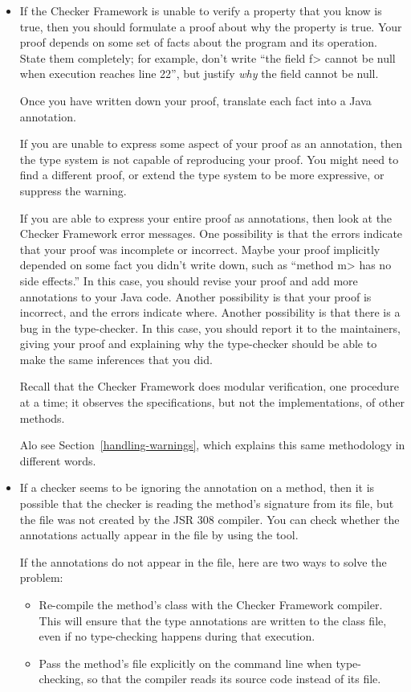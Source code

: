 \begin{itemize}
\item
  If the Checker Framework is unable to verify a property that you know is
  true, then you should formulate a proof about why the property is true.
  Your proof depends on some set of facts about the program and its
  operation.  State them completely; for example, don't write ``the field
  \<f> cannot be null when execution reaches line 22'', but justify
  \emph{why} the field cannot be null.

  Once you have written down your proof, translate each fact into a Java
  annotation.

  If you are unable to express some aspect of your proof as an annotation,
  then the type system is not capable of reproducing your proof.  You might
  need to find a different proof, or extend the type system to be more
  expressive, or suppress the warning.

  If you are able to express your entire proof as annotations, then look at
  the Checker Framework error messages.  One possibility is that the errors
  indicate that your proof was incomplete or incorrect.  Maybe your proof
  implicitly depended on some fact you didn't write down, such as ``method
  \<m> has no side effects.''  In this case, you should revise your proof
  and add more annotations to your Java code.  Another possibility is that
  your proof is incorrect, and the errors indicate where.  Another
  possibility is that there is a bug in the type-checker.  In this case,
  you should report it to the maintainers, giving your proof and explaining
  why the type-checker should be able to make the same inferences that you did.

  Recall that the Checker Framework does modular verification,
  one procedure at a time; it observes the specifications, but not the
  implementations, of other methods.

  Alo see Section~\ref{handling-warnings}, which explains this same
  methodology in different words.

\item
If a checker seems to be ignoring the annotation on a method, then it is
possible that the checker is reading the method's signature from its
 file, but the  file was not created by the JSR
308 compiler.  You can check whether the annotations actually appear in the
 file by using the  tool.

If the annotations do not appear in the  file, here are two
ways to solve the problem:
\begin{itemize}
\item
  Re-compile the method's class with the Checker Framework compiler.  This will
  ensure that the type annotations are written to the class file, even if
  no type-checking happens during that execution.
\item
  Pass the method's file explicitly on the command line when type-checking,
  so that the compiler reads its source code instead of its 
  file.
\end{itemize}


\end{itemize}
